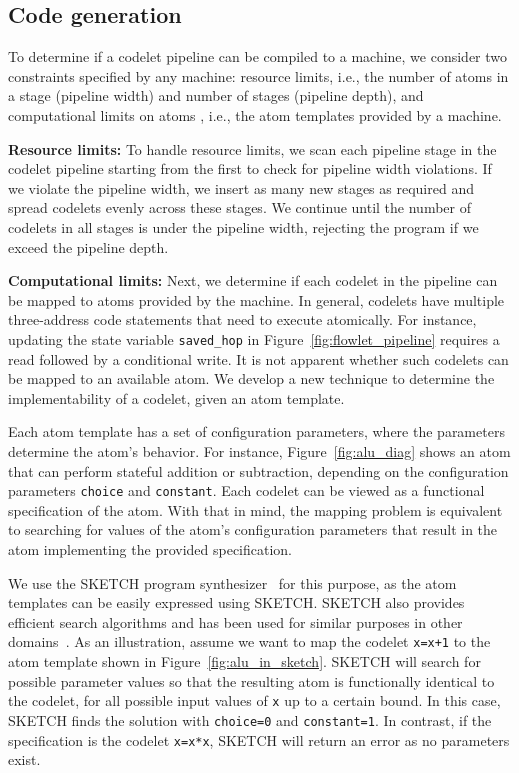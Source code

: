 \subsection{Code generation}
\label{ss:code_gen}

To determine if a codelet pipeline can be compiled to a \absmachine machine,
we consider two constraints specified by any \absmachine machine: resource
limits, i.e., the number of atoms in a stage (pipeline width) and number of
stages (pipeline depth), and computational limits on atoms
, i.e., the atom templates provided by a \absmachine machine.

\textbf{Resource limits:} To handle resource limits, we scan each pipeline
stage in the codelet pipeline starting from the first to check for pipeline
width violations. If we violate the pipeline width, we insert as many new
stages as required and spread codelets evenly across these stages.  We continue
until the number of codelets in all stages is under the pipeline width,
rejecting the program if we exceed the pipeline depth.

\textbf{Computational limits:} Next, we determine if each codelet in the pipeline
can be mapped to atoms provided by the \absmachine machine. In general,
codelets have multiple three-address code statements that need to execute
atomically. For instance, updating the state variable \texttt{saved\_hop} in
Figure~\ref{fig:flowlet_pipeline} requires a read followed by a conditional
write.  It is not apparent whether such codelets can be mapped to an available
atom. We develop a new technique to determine the implementability of a codelet,
given an atom template.

Each atom template has a set of configuration parameters, where the parameters
determine the atom's behavior.  For instance, Figure~\ref{fig:alu_diag} shows
an atom that can perform stateful addition or subtraction, depending on the
configuration parameters {\tt choice} and {\tt constant}.  Each codelet can be
viewed as a functional specification of the atom.  With that in mind, the
mapping problem is equivalent to searching for values of the atom's configuration
parameters that result in the atom implementing the provided specification.

We use the SKETCH program synthesizer~\cite{sketch_asplos} for this purpose, as
the atom templates can be easily expressed using SKETCH. SKETCH also
provides efficient search algorithms and has been used for similar purposes in
other domains~\cite{lifejoin, qbs}. As an
illustration, assume we want to map the codelet {\tt x=x+1} to the atom
template shown in Figure~\ref{fig:alu_in_sketch}. SKETCH will search for
possible parameter values so that the resulting atom is functionally identical
to the codelet, for all possible input values of {\tt x} up to a certain bound. 
In this case, SKETCH
finds the solution with {\tt choice=0} and {\tt constant=1}.  In contrast, if
the specification is the codelet {\tt x=x*x}, SKETCH will return
an error as no parameters exist.

